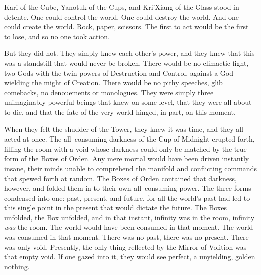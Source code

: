 \simpleline	
{}

Kari of the Cube, Yanotuk of the Cups, and Kri’Xiang of the Glass stood in detente. One could control the world. One could destroy the world. And one could create the world. Rock, paper, scissors. The first to act would be the first to lose, and so no one took action.


But they did not. They simply knew each other’s power, and they knew that this was a standstill that would never be broken. There would be no climactic fight, two Gods with the twin powers of Destruction and Control, against a God wielding the might of Creation. There would be no pithy speeches, glib comebacks, no denouements or monologues. They were simply three unimaginably powerful beings that knew on some level, that they were all about to die, and that the fate of the very world hinged, in part, on this moment.

When they felt the shudder of the Tower, they knew it was time, and they all acted at once.
\SmallVSpace
The all\mbox{--}consuming darkness of the Cup of Midnight erupted forth, filling the room with a void whose darkness could only be matched by the true form of the Boxes of Orden. Any mere mortal would have been driven instantly insane, their minds unable to comprehend the manifold and conflicting commands that spewed forth at random.
\SmallVSpace
The Boxes of Orden contained that darkness, however, and folded them in to their own all\mbox{--}consuming power. The three forms condensed into one: past, present, and future, for all the world’s past had led to this single point in the present that would dictate the future. The Boxes unfolded, the Box unfolded, and in that instant, infinity was in the room, infinity \emph{was} the room.
\SmallVSpace
The world would have been consumed in that moment. The world was consumed in that moment. There was no past, there was no present. There was only void.
\SmallVSpace
Presently, the only thing reflected by the Mirror of Volition was that empty void. If one gazed into it, they would see perfect, a unyielding, golden nothing.

